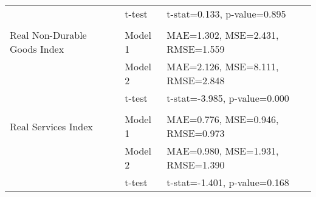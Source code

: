 \documentclass[a4paper,12pt]{article}
\begin{document}
\begin{table}
\begin{tabular}{llp{10cm}}
 & t-test & t-stat=0.133, p-value=0.895 \\
\arrayrulecolor{black!30}\midrule &  &  \\
Real Non-Durable Goods Index & Model 1 & MAE=1.302, MSE=2.431, RMSE=1.559 \\
 & Model 2 & MAE=2.126, MSE=8.111, RMSE=2.848 \\
 & t-test & t-stat=-3.985, p-value=0.000 \\
\arrayrulecolor{black!30}\midrule &  &  \\
Real Services Index & Model 1 & MAE=0.776, MSE=0.946, RMSE=0.973 \\
 & Model 2 & MAE=0.980, MSE=1.931, RMSE=1.390 \\
 & t-test & t-stat=-1.401, p-value=0.168 \\
\bottomrule
\end{tabular}
\end{table}
\end{document}
